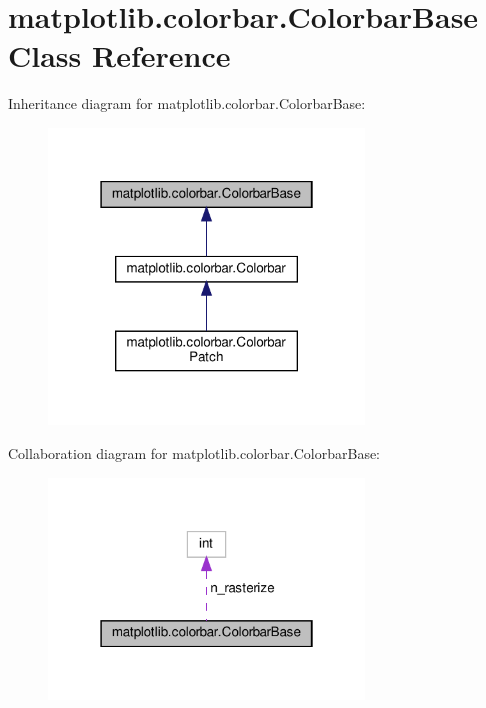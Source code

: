 \hypertarget{classmatplotlib_1_1colorbar_1_1ColorbarBase}{}\section{matplotlib.\+colorbar.\+Colorbar\+Base Class Reference}
\label{classmatplotlib_1_1colorbar_1_1ColorbarBase}


Inheritance diagram for matplotlib.\+colorbar.\+Colorbar\+Base\+:
\nopagebreak
\begin{figure}[H]
\begin{center}
\leavevmode
\includegraphics[width=238pt]{classmatplotlib_1_1colorbar_1_1ColorbarBase__inherit__graph}
\end{center}
\end{figure}


Collaboration diagram for matplotlib.\+colorbar.\+Colorbar\+Base\+:
\nopagebreak
\begin{figure}[H]
\begin{center}
\leavevmode
\includegraphics[width=238pt]{classmatplotlib_1_1colorbar_1_1ColorbarBase__coll__graph}
\end{center}
\end{figure}
